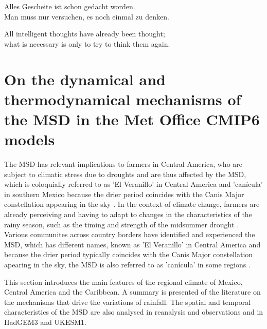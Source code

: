 \begin{savequote}[8cm]
Alles Gescheite ist schon gedacht worden.\\
Man muss nur versuchen, es noch einmal zu denken.

All intelligent thoughts have already been thought;\\
what is necessary is only to try to think them again.
\end{savequote}

\chapter{\label{ch:2-litreview}On the dynamical and thermodynamical mechanisms of the MSD in the Met Office CMIP6 models}

\minitoc


The MSD has relevant implications to farmers in Central America, who are subject to climatic stress due to droughts and are thus affected by the MSD, which is coloquially referred to as 'El Veranillo' in Central America and 'can\' icula' in southern Mexico because the drier period  coincides with the Canis Major constellation appearing in the sky \citep{dilley1996}. In the context of climate change, farmers are already perceiving and having to adapt to changes in the characteristics of the rainy season, such as the timing and strength of the midsummer drought \citep{hellin2017,de2018,harvey2018}. Various communites across country borders have identified and experienced the MSD, which has different names, known as 'El Veranillo' in Central America and because the drier period typically coincides with the Canis Major constellation apearing in the sky, the MSD is also referred to as 'can\' icula' in some regions \citep{dilley1996}.  

This section introduces the main features of the regional climate of Mexico, Central America and the Caribbean. A summary is presented of the literature on the mechanisms that drive the variations of rainfall. The spatial and temporal characteristics of the MSD are also analysed in reanalysis and observations and in HadGEM3 and UKESM1.

